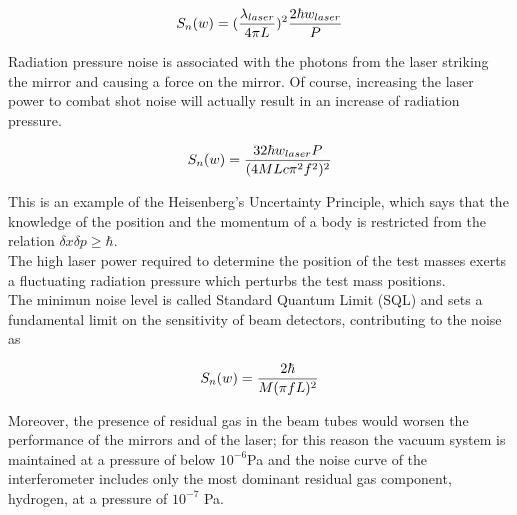\documentclass[binding=0.6cm, LaM]{sapthesis}
\begin{document}
                \begin{equation}
                S_n(w) = ({{\lambda_{laser}} \over {4 \pi L}})^2 {{2 \hbar w_{laser}} \over {P}}
                \end{equation}

        Radiation pressure noise is associated with the photons from the laser striking the mirror
        and causing a force on the mirror. Of course, increasing the laser power to combat shot noise
        will actually result in an increase of radiation pressure.

                \begin{equation}
                S_n(w) =  {{32 \hbar w_{laser}P} \over {(4MLc \pi^2 f^2)^2}}
                \end{equation}

        This is an example of the Heisenberg’s Uncertainty Principle, which says that the knowledge
        of the position and the momentum of a body is restricted from the relation $\delta x \delta p \geq \hbar$. \\
        The high laser power required to determine the position of the test masses exerts
        a fluctuating radiation pressure which perturbs the test mass positions. \\
        The minimun noise level is called Standard Quantum Limit (SQL) and sets a fundamental limit
        on the sensitivity of beam detectors, contributing to the noise as

                \begin{equation}
                S_n(w) = {{2 \hbar} \over {M(\pi f L)^2}}
                \end{equation}

        Moreover, the presence of residual gas in the beam tubes would worsen the performance
        of the mirrors and of the laser; for this reason the vacuum system is maintained at a pressure
        of below $10^{-6}$Pa and the noise curve of the interferometer includes only
        the most dominant residual gas component, hydrogen, at a pressure of $10^{−7}$ Pa. \\
\end{document}
